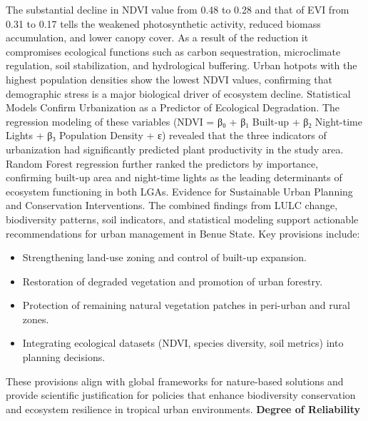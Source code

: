 The substantial decline in NDVI value from 0.48 to 0.28 and that of EVI from 0.31 to 0.17 tells the weakened photosynthetic activity, reduced biomass accumulation, and lower canopy cover. As a result of the reduction it compromises ecological functions such as carbon sequestration, microclimate regulation, soil stabilization, and hydrological buffering. Urban hotpots with the highest population densities show the lowest NDVI values, confirming that demographic stress is a major biological driver of ecosystem decline.
Statistical Models Confirm Urbanization as a Predictor of Ecological Degradation.
The regression modeling of these variables (NDVI = β₀ + β₁ Built-up + β₂ Night-time Lights + β₃ Population Density + ε) revealed that the three indicators of urbanization had significantly predicted plant productivity in the study area. Random Forest regression further ranked the predictors by importance, confirming built-up area and night-time lights as the leading determinants of ecosystem functioning in both LGAs.
Evidence for Sustainable Urban Planning and Conservation Interventions.
The combined findings from LULC change, biodiversity patterns, soil indicators, and statistical modeling support actionable recommendations for urban management in Benue State. Key provisions include:
\begin{itemize}
\item
  Strengthening land-use zoning and control of built-up expansion.
\item
  Restoration of degraded vegetation and promotion of urban forestry.
\item
  Protection of remaining natural vegetation patches in peri-urban and rural zones.
\item
  Integrating ecological datasets (NDVI, species diversity, soil metrics) into planning decisions.
\end{itemize}

These provisions align with global frameworks for nature-based solutions and provide scientific justification for policies that enhance biodiversity conservation and ecosystem resilience in tropical urban environments.
{}\textbf{Degree of Reliability}

